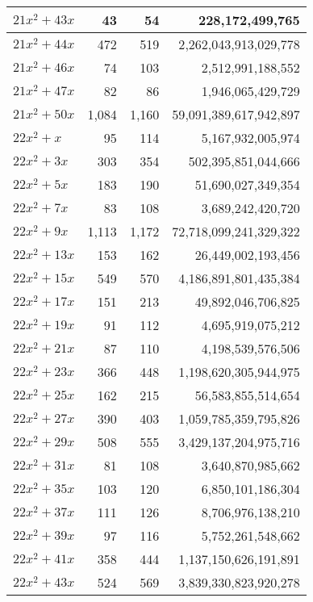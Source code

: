 \documentclass[a4paper]{amsproc}
\theoremstyle{plain}
\begin{document}
\begin{longtable}{ | l | r | r | r | }
$21x^2 + 43x$ & 43 & 54 & 228{,}172{,}499{,}765 \\ \hline
$21x^2 + 44x$ & 472 & 519 & 2{,}262{,}043{,}913{,}029{,}778 \\ \hline
$21x^2 + 46x$ & 74 & 103 & 2{,}512{,}991{,}188{,}552 \\ \hline
$21x^2 + 47x$ & 82 & 86 & 1{,}946{,}065{,}429{,}729 \\ \hline
$21x^2 + 50x$ & 1{,}084 & 1{,}160 & 59{,}091{,}389{,}617{,}942{,}897 \\ \hline
$22x^2 + x$ & 95 & 114 & 5{,}167{,}932{,}005{,}974 \\ \hline
$22x^2 + 3x$ & 303 & 354 & 502{,}395{,}851{,}044{,}666 \\ \hline
$22x^2 + 5x$ & 183 & 190 & 51{,}690{,}027{,}349{,}354 \\ \hline
$22x^2 + 7x$ & 83 & 108 & 3{,}689{,}242{,}420{,}720 \\ \hline
$22x^2 + 9x$ & 1{,}113 & 1{,}172 & 72{,}718{,}099{,}241{,}329{,}322 \\ \hline
$22x^2 + 13x$ & 153 & 162 & 26{,}449{,}002{,}193{,}456 \\ \hline
$22x^2 + 15x$ & 549 & 570 & 4{,}186{,}891{,}801{,}435{,}384 \\ \hline
$22x^2 + 17x$ & 151 & 213 & 49{,}892{,}046{,}706{,}825 \\ \hline
$22x^2 + 19x$ & 91 & 112 & 4{,}695{,}919{,}075{,}212 \\ \hline
$22x^2 + 21x$ & 87 & 110 & 4{,}198{,}539{,}576{,}506 \\ \hline
$22x^2 + 23x$ & 366 & 448 & 1{,}198{,}620{,}305{,}944{,}975 \\ \hline
$22x^2 + 25x$ & 162 & 215 & 56{,}583{,}855{,}514{,}654 \\ \hline
$22x^2 + 27x$ & 390 & 403 & 1{,}059{,}785{,}359{,}795{,}826 \\ \hline
$22x^2 + 29x$ & 508 & 555 & 3{,}429{,}137{,}204{,}975{,}716 \\ \hline
$22x^2 + 31x$ & 81 & 108 & 3{,}640{,}870{,}985{,}662 \\ \hline
$22x^2 + 35x$ & 103 & 120 & 6{,}850{,}101{,}186{,}304 \\ \hline
$22x^2 + 37x$ & 111 & 126 & 8{,}706{,}976{,}138{,}210 \\ \hline
$22x^2 + 39x$ & 97 & 116 & 5{,}752{,}261{,}548{,}662 \\ \hline
$22x^2 + 41x$ & 358 & 444 & 1{,}137{,}150{,}626{,}191{,}891 \\ \hline
$22x^2 + 43x$ & 524 & 569 & 3{,}839{,}330{,}823{,}920{,}278 \\ \hline

\end{longtable}
\end{document}
